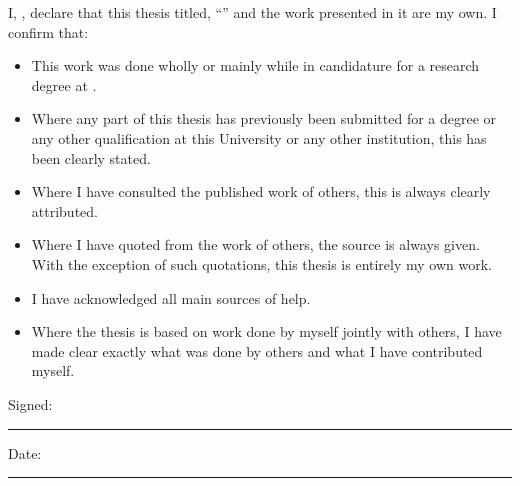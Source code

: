 \documentclass[
11pt, %
english, %
singlespacing, %
headsepline, %
]{MastersDoctoralThesis} %
\begin{document}

\begin{declaration}
\addchaptertocentry{\authorshipname} %
\noindent I, \authorname, declare that this thesis titled, \enquote{\ttitle} and the work presented in it are my own. I confirm that:

\begin{itemize} 
\item This work was done wholly or mainly while in candidature for a research degree at \univname.
\item Where any part of this thesis has previously been submitted for a degree or any other qualification at this University or any other institution, this has been clearly stated.
\item Where I have consulted the published work of others, this is always clearly attributed.
\item Where I have quoted from the work of others, the source is always given. With the exception of such quotations, this thesis is entirely my own work.
\item I have acknowledged all main sources of help.
\item Where the thesis is based on work done by myself jointly with others, I have made clear exactly what was done by others and what I have contributed myself.\\
\end{itemize}
 
\noindent Signed:\\
\rule[0.5em]{25em}{0.5pt} %
 
\noindent Date:\\
\rule[0.5em]{25em}{0.5pt} %
\end{declaration}

\cleardoublepage

\end{document}
